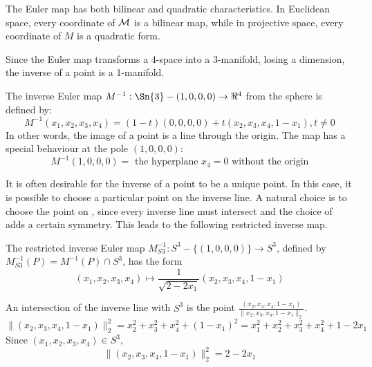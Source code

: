 \documentclass[12pt]{article}
\begin{document}
The Euler map has both bilinear and quadratic characteristics.
In Euclidean space, every coordinate of ${\cal M}$ is a bilinear map,
while in projective space, every coordinate of $M$ is a quadratic form.

Since the Euler map transforms a 4-space into a 3-manifold, losing a dimension,
the inverse of a point is a 1-manifold.

\begin{lemma}
\label{lem:inverse}
The inverse Euler map $M^{-1}: \Sn{3} - (1,0,0,0) \rightarrow \Re^4$ from the sphere
is defined by:
\begin{equation}
M^{-1}(x_1,x_2,x_3,x_4) = (1-t)(0,0,0,0) + t(x_2,x_3,x_4,1-x_1), t \neq 0
\end{equation}
In other words, the image of a point is a line through the origin.
The map has a special behaviour at the pole $(1,0,0,0)$:
\begin{equation}
M^{-1}(1,0,0,0) = \mbox{ the hyperplane $x_4=0$ without the origin}
\end{equation}
\end{lemma}
\prf
\QED

It is often desirable for the inverse of a point to be a unique point.
In this case, it is possible to choose a particular point on the inverse line.
A natural choice is to choose the point on , since every inverse line must intersect
 and the choice of  adds a certain symmetry.
This leads to the following restricted inverse map.

\begin{lemma}
The restricted inverse Euler map $M^{-1}_{S3}: S^3 - \{(1,0,0,0)\} \rightarrow S^3$,
defined by $M^{-1}_{S3}(P) = M^{-1}(P) \cap S^3$, has the form
\begin{equation}
(x_1,x_2,x_3,x_4) \mapsto \frac{1}{\sqrt{2-2x_1}}(x_2,x_3,x_4,1-x_1)
\end{equation}
\end{lemma}
\prf
An intersection of the inverse line with $S^3$
is the point $\frac{(x_2,x_3,x_4,1-x_1)}{\|x_2,x_3,x_4,1-x_1\|_2}$.
\[
\|(x_2,x_3,x_4,1-x_1)\|_2^2 = x_2^2 + x_3^2 + x_4^2 + (1-x_1)^2
= x_1^2 + x_2^2 + x_3^2 + x_4^2 + 1 - 2x_1
\]
Since $(x_1,x_2,x_3,x_4) \in S^3$,
\[
\|(x_2,x_3,x_4,1-x_1)\|_2^2 = 2 - 2x_1
\]
\QED

\end{document}
